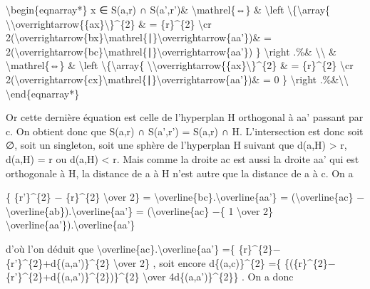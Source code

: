 \documentclass[]{article}
\begin{document}
\textbackslash{}begin\{eqnarray*\} x ∈ S(a,r) ∩ S(a',r')\&
\textbackslash{}mathrel\{⇔\} \& \textbackslash{}left
\textbackslash{}\{\textbackslash{}array\{
\textbackslash{}\textbar{}\textbackslash{}overrightarrow\{\{ax\}\textbackslash{}\textbar{}\}\^{}\{2\}
\& = \{r\}\^{}\{2\} \textbackslash{}cr
2(\textbackslash{}overrightarrow\{bx\}\textbackslash{}mathrel\{∣\}\textbackslash{}overrightarrow\{aa'\})\&
=
2(\textbackslash{}overrightarrow\{bc\}\textbackslash{}mathrel\{∣\}\textbackslash{}overrightarrow\{aa'\})
\} \textbackslash{}right .\%\& \textbackslash{}\textbackslash{} \&
\textbackslash{}mathrel\{⇔\} \& \textbackslash{}left
\textbackslash{}\{\textbackslash{}array\{
\textbackslash{}\textbar{}\textbackslash{}overrightarrow\{\{ax\}\textbackslash{}\textbar{}\}\^{}\{2\}
\& = \{r\}\^{}\{2\} \textbackslash{}cr
2(\textbackslash{}overrightarrow\{cx\}\textbackslash{}mathrel\{∣\}\textbackslash{}overrightarrow\{aa'\})\&
= 0 \} \textbackslash{}right .\%\&\textbackslash{}\textbackslash{}
\textbackslash{}end\{eqnarray*\}

Or cette dernière équation est celle de l'hyperplan H orthogonal à aa'
passant par c. On obtient donc que S(a,r) ∩ S(a',r') = S(a,r) ∩ H.
L'intersection est donc soit ∅, soit un singleton, soit une sphère de
l'hyperplan H suivant que d(a,H) \textgreater{} r, d(a,H) = r ou d(a,H)
\textless{} r. Mais comme la droite ac est aussi la droite aa' qui est
orthogonale à H, la distance de a à H n'est autre que la distance de a à
c. On a

\{ \{r'\}\^{}\{2\} − \{r\}\^{}\{2\} \textbackslash{}over 2\} =
\textbackslash{}overline\{bc\}.\textbackslash{}overline\{aa'\} =
(\textbackslash{}overline\{ac\}
−\textbackslash{}overline\{ab\}).\textbackslash{}overline\{aa'\} =
(\textbackslash{}overline\{ac\} −\{ 1 \textbackslash{}over 2\}
\textbackslash{}overline\{aa'\}).\textbackslash{}overline\{aa'\}

d'où l'on déduit que
\textbackslash{}overline\{ac\}.\textbackslash{}overline\{aa'\} =\{
\{r\}\^{}\{2\}−\{r'\}\^{}\{2\}+d\{(a,a')\}\^{}\{2\} \textbackslash{}over
2\} , soit encore d\{(a,c)\}\^{}\{2\} =\{
\{(\{r\}\^{}\{2\}−\{r'\}\^{}\{2\}+d\{(a,a')\}\^{}\{2\})\}\^{}\{2\}
\textbackslash{}over 4d\{(a,a')\}\^{}\{2\}\} . On a donc
\end{document}
